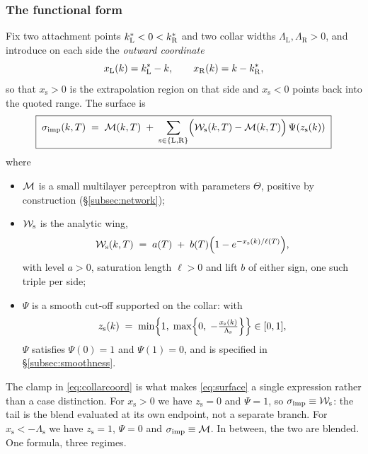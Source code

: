 \subsubsection*{The functional form}

Fix two attachment points $k^{*}_{\mathrm{L}}<0<k^{*}_{\mathrm{R}}$ and two collar widths
$\Lambda_{\mathrm{L}},\Lambda_{\mathrm{R}}>0$, and introduce on each side the \emph{outward
coordinate}
\begin{equation}\label{eq:outward}
  x_{\mathrm{L}}(k)=k^{*}_{\mathrm{L}}-k,
  \qquad
  x_{\mathrm{R}}(k)=k-k^{*}_{\mathrm{R}},
\end{equation}
so that $x_{\mathrm{s}}>0$ is the extrapolation region on that side and $x_{\mathrm{s}}<0$ points
back into the quoted range. The surface is
\begin{equation}
  \boxed{\;
  \sigma_{\mathrm{imp}}(k,T)\;=\;\mathcal{M}(k,T)\;+\;\sum_{\mathrm{s}\in\{\mathrm{L},\mathrm{R}\}}
    \Bigl(\mathcal{W}_{\mathrm{s}}(k,T)-\mathcal{M}(k,T)\Bigr)\,\Psi\!\left(z_{\mathrm{s}}(k)\right)
  \;}
  \label{eq:surface}
\end{equation}
where
\begin{itemize}
  \item $\mathcal{M}$ is a small multilayer perceptron with parameters $\Theta$, positive by construction
    (\S\ref{subsec:network});
  \item $\mathcal{W}_{\mathrm{s}}$ is the analytic wing,
    \begin{equation}
      \mathcal{W}_{\mathrm{s}}(k,T)\;=\;a(T)\;+\;b(T)\Bigl(1-e^{-x_{\mathrm{s}}(k)/\ell(T)}\Bigr),
      \label{eq:wing}
    \end{equation}
    with level $a>0$, saturation length $\ell>0$ and lift $b$ of either sign, one such triple per
    side;
  \item $\Psi$ is a smooth cut-off supported on the collar: with
    \begin{equation}\label{eq:collarcoord}
      z_{\mathrm{s}}(k)\;=\;\min\Bigl\{1,\;\max\Bigl\{0,\;-\tfrac{x_{\mathrm{s}}(k)}{\Lambda_{\mathrm{s}}}\Bigr\}\Bigr\}\in[0,1],
    \end{equation}
    $\Psi$ satisfies $\Psi(0)=1$ and $\Psi(1)=0$, and is specified in \S\ref{subsec:smoothness}.
\end{itemize}

The clamp in \eqref{eq:collarcoord} is what makes \eqref{eq:surface} a single expression rather than
a case distinction. For $x_{\mathrm{s}}>0$ we have $z_{\mathrm{s}}=0$ and $\Psi=1$, so
$\sigma_{\mathrm{imp}}\equiv\mathcal{W}_{\mathrm{s}}$: the tail is the blend evaluated at its own endpoint, not a separate
branch. For $x_{\mathrm{s}}<-\Lambda_{\mathrm{s}}$ we have $z_{\mathrm{s}}=1$, $\Psi=0$ and
$\sigma_{\mathrm{imp}}\equiv\mathcal{M}$. In between, the two are blended. One formula, three regimes.

